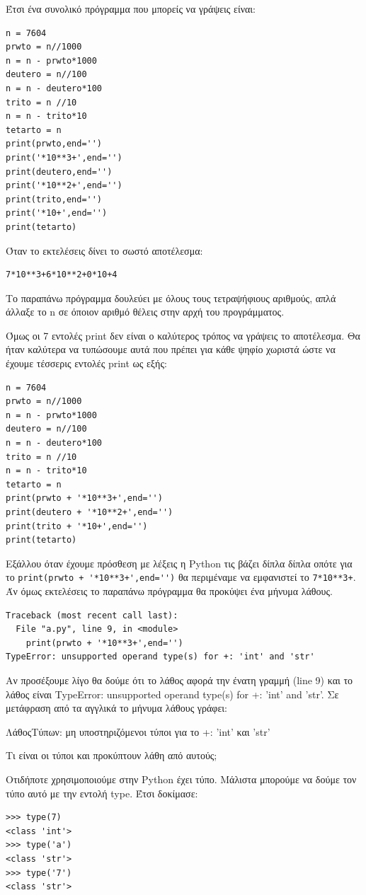 \documentclass[b5paper,11pt,twoside,openleft]{memoir}
\begin{document}
Έτσι ένα συνολικό πρόγραμμα που μπορείς να γράψεις είναι:
\begin{lstlisting}
n = 7604
prwto = n//1000
n = n - prwto*1000
deutero = n//100
n = n - deutero*100
trito = n //10
n = n - trito*10
tetarto = n
print(prwto,end='')
print('*10**3+',end='')
print(deutero,end='')
print('*10**2+',end='')
print(trito,end='')
print('*10+',end='')
print(tetarto)
\end{lstlisting}
Όταν το εκτελέσεις δίνει το σωστό αποτέλεσμα:
\begin{lstlisting}
7*10**3+6*10**2+0*10+4
\end{lstlisting}

Το παραπάνω πρόγραμμα δουλεύει με όλους τους τετραψήφιους αριθμούς, απλά άλλαξε το n σε όποιον αριθμό θέλεις στην αρχή του προγράμματος.


Όμως οι 7 εντολές print δεν είναι ο καλύτερος τρόπος να γράψεις το αποτέλεσμα. Θα ήταν καλύτερα να τυπώσουμε αυτά που πρέπει για κάθε ψηφίο χωριστά ώστε να έχουμε τέσσερις εντολές print ως εξής:
\begin{lstlisting}
n = 7604
prwto = n//1000
n = n - prwto*1000
deutero = n//100
n = n - deutero*100
trito = n //10
n = n - trito*10
tetarto = n
print(prwto + '*10**3+',end='')
print(deutero + '*10**2+',end='')
print(trito + '*10+',end='')
print(tetarto)
\end{lstlisting}

Εξάλλου όταν έχουμε πρόσθεση με λέξεις η Python τις βάζει δίπλα δίπλα οπότε για το \lstinline{print(prwto + '*10**3+',end='')}
θα περιμέναμε να εμφανιστεί το \lstinline{7*10**3+}. 
Άν όμως εκτελέσεις το παραπάνω πρόγραμμα θα προκύψει ένα μήνυμα λάθους.
\begin{lstlisting}
Traceback (most recent call last):
  File "a.py", line 9, in <module>
    print(prwto + '*10**3+',end='')
TypeError: unsupported operand type(s) for +: 'int' and 'str'
\end{lstlisting}
Αν προσέξουμε λίγο θα δούμε ότι το λάθος αφορά την ένατη γραμμή (line 9) και το λάθος είναι TypeError: unsupported operand type(s) for +: 'int' and 'str'.
Σε μετάφραση από τα αγγλικά το μήνυμα λάθους γράφει:

ΛάθοςΤύπων: μη υποστηριζόμενοι τύποι για το +: 'int' και 'str'

Τι είναι οι τύποι και προκύπτουν λάθη από αυτούς;

Οτιδήποτε χρησιμοποιούμε στην Python έχει τύπο. Μάλιστα μπορούμε να δούμε τον τύπο αυτό με την εντολή type. Έτσι δοκίμασε:
\begin{lstlisting}
>>> type(7)
<class 'int'>
>>> type('a')
<class 'str'>
>>> type('7')
<class 'str'>
\end{lstlisting} 
\end{document}
